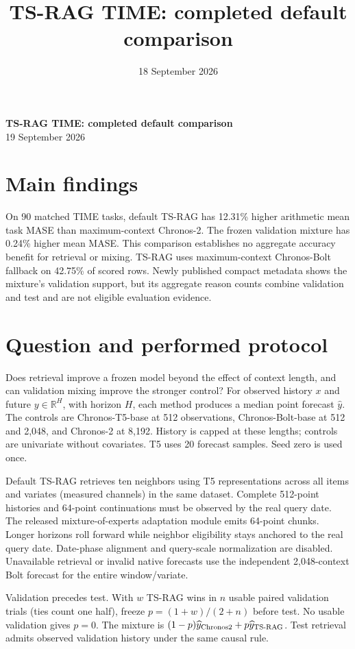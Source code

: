 \documentclass[11pt,a4paper]{article}
\title{TS-RAG TIME: completed default comparison}
\author{}\date{18 September 2026}
\begin{document}
\begin{center}
{\Large\bfseries TS-RAG TIME: completed default comparison}\\[5pt]
19 September 2026
\end{center}
\section*{Main findings}
On 90 matched TIME tasks, default TS-RAG has 12.31\% higher arithmetic mean
task MASE than maximum-context Chronos-2. The frozen validation mixture has
0.24\% higher mean MASE. This comparison establishes no aggregate accuracy
benefit for retrieval or mixing. TS-RAG uses maximum-context Chronos-Bolt
fallback on 42.75\% of scored rows. Newly published compact metadata shows
the mixture's validation support, but its aggregate reason counts combine
validation and test and are not eligible evaluation evidence.

\section{Question and performed protocol}
Does retrieval improve a frozen model beyond the effect of context length,
and can validation mixing improve the stronger control?
For observed history $x$ and future $y\in\mathbb R^H$, with horizon $H$,
each method produces a median point forecast $\widehat y$.
The controls are Chronos-T5-base at 512 observations, Chronos-Bolt-base at
512 and 2,048, and Chronos-2 at 8,192. History is capped at these lengths;
controls are univariate without covariates. T5 uses 20 forecast samples.
Seed zero is used once.

Default TS-RAG retrieves ten neighbors using T5 representations across all
items and variates (measured channels) in the same dataset. Complete
512-point histories and 64-point continuations must be observed by the real
query date. The released mixture-of-experts adaptation module emits
64-point chunks. Longer horizons roll forward while neighbor eligibility
stays anchored to the real query date. Date-phase alignment and query-scale
normalization are disabled. Unavailable retrieval or invalid native
forecasts use the independent 2,048-context Bolt forecast for the entire
window/variate.

Validation precedes test. With $w$ TS-RAG wins in $n$ usable paired
validation trials (ties count one half), freeze $p=(1+w)/(2+n)$ before test.
No usable validation gives $p=0$. The mixture is
$(1-p)\widehat y_{\rm Chronos2}+p\widehat y_{\rm TS\text{-}RAG}$.
Test retrieval admits observed validation history under the same causal rule.
\end{document}
